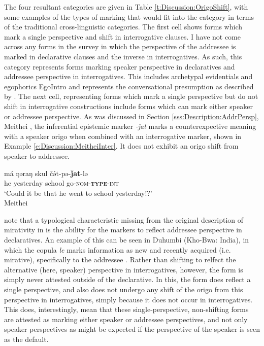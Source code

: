 The four resultant categories are given in Table \ref{t:Discussion:OrigoShift}, with some examples of the types of marking that would fit into the category in terms of the traditional cross-linguistic categories. The first cell shows forms which mark a single perspective and shift in interrogative clauses. I have not come across any forms in the survey in which the perspective of the addressee is marked in declarative clauses and the inverse in interrogatives. As such, this category represents forms marking speaker perspective in declaratives and addressee perspective in interrogatives. This includes archetypal evidentials and egophorics \cite{Aikhenvald2004}{EgoIntro} and represents the conversational presumption as described by . The next cell, representing forms which mark a single perspective but do not shift in interrogative constructions include forms which can mark either speaker or addressee perspective. As was discussed in Section \ref{sss:Description:AddrPersp}, Meithei \cite[Internal Isolate: India,][]{Chelliah1997}, the inferential epistemic marker \textit{-ǰat} marks a counterexpective meaning with a speaker origo when combined with an interrogative marker, shown in Example \ref{e:Discussion:MeitheiInter}. It does not exhibit an origo shift from speaker to addressee.

\begin{exe}
    \ex \label{e:Discussion:MeitheiInter}
    \gll má ŋəraŋ skul čə́t-pə-\textbf{ǰat}-lə \\
    he yesterday school go-\textsc{nom-\textbf{type}-int} \\
    \glt `Could it be that he went to school yesterday!?' \\
    Meithei \cite[Internal Isolate:India,][296]{Chelliah1997}
\end{exe}

 note that a typological characteristic missing from the original description of mirativity in  is the ability for the markers to reflect addressee perspective in declaratives. An example of this can be seen in Duhumbi (Kho-Bwa: India), in which the copula \textit{le} marks information as new and recently acquired (i.e. mirative), specifically to the addressee \cite[405]{Bodt2020}. Rather than shifting to relfect the alternative (here, speaker) perspective in interrogatives, however, the form is simply never attested outside of the declarative. In this, the form does reflect a single perspective, and also does not undergo any shift of the origo from this perspective in interrogatives, simply because it does not occur in interrogatives. This does, interestingly, mean that these single-perspective, non-shifting forms are attested as marking either speaker or addressee perspectives, and not only speaker perspectives as might be expected if the perspective of the speaker is seen as the default.

